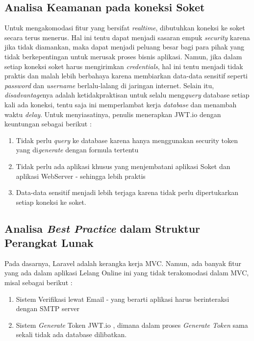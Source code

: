     \subsection{Analisa Keamanan pada koneksi Soket}
    \label{alasan-socket.io}
    Untuk mengakomodasi fitur yang bersifat \textit{realtime}, dibutuhkan koneksi ke soket secara terus menerus. Hal ini tentu dapat menjadi sasaran empuk \textit{security} karena jika tidak diamankan, maka dapat menjadi peluang besar bagi para pihak yang tidak berkepentingan untuk merusak proses bisnis aplikasi.
    Namun, jika dalam setiap koneksi soket harus mengirimkan \textit{credentials}, hal ini tentu menjadi tidak praktis dan malah lebih berbahaya karena membiarkan data-data sensitif seperti \textit{password} dan \textit{username} berlalu-lalang di jaringan internet. Selain itu, \textit{disadvantage}nya adalah ketidakpraktisan untuk selalu meng\textit{query} database setiap kali ada koneksi, tentu saja ini memperlambat kerja \textit{database} dan menambah waktu \textit{delay}.
    Untuk menyiasatinya, penulis menerapkan JWT.io dengan keuntungan sebagai berikut :
    \begin{enumerate}
    \item Tidak perlu \textit{query} ke database karena hanya menggunakan security token yang di\textit{generate} dengan formula tertentu
    \item Tidak perlu ada aplikasi khusus yang menjembatani aplikasi Soket dan aplikasi WebServer - sehingga lebih praktis
    \item Data-data sensitif menjadi lebih terjaga karena tidak perlu dipertukarkan setiap koneksi ke soket.
    \end{enumerate}
    
    \subsection{Analisa \textit{Best Practice} dalam Struktur Perangkat Lunak}
    \label{alasan-best-practice}
    Pada dasarnya, Laravel adalah kerangka kerja MVC. Namun, ada banyak fitur yang ada dalam aplikasi Lelang Online ini yang tidak terakomodasi dalam MVC, misal sebagai berikut :
    \begin{enumerate}
    \item Sistem Verifikasi lewat Email - yang berarti aplikasi harus berinteraksi dengan SMTP server
    \item Sistem \textit{Generate} Token JWT.io , dimana dalam proses \textit{Generate Token} sama sekali tidak ada database dilibatkan.
    \end{enumerate}
    

